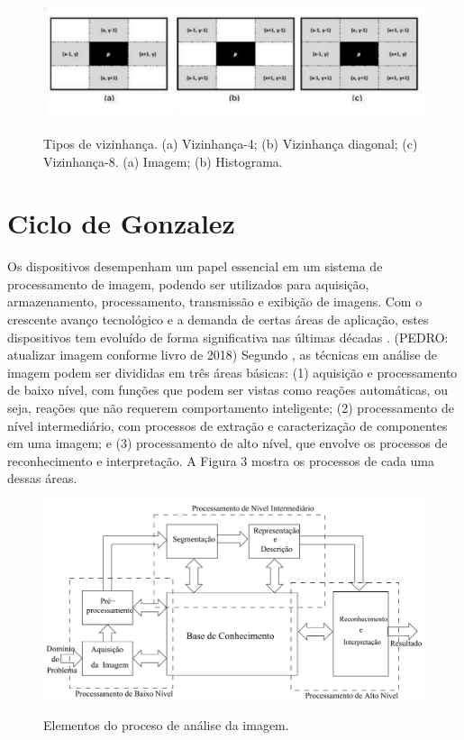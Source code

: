  \begin{figure}[h]
	\centering
	\includegraphics[width=1.0\textwidth]{Imagens/imagem3} %
	\caption[Texto que vai aparecer na lista de fig.]{Tipos de vizinhança. (a) Vizinhança-4; (b) Vizinhança diagonal; (c) Vizinhança-8.  (a) Imagem; (b) Histograma.}
	\label{fig:tux_laplace}
\end{figure}


\section{Ciclo de Gonzalez}
Os dispositivos desempenham um papel essencial em um sistema de processamento de imagem, podendo ser utilizados para aquisição, armazenamento, processamento, transmissão e exibição de imagens. Com o crescente avanço tecnológico e a demanda de certas áreas de aplicação, estes dispositivos tem evoluído de forma significativa nas últimas décadas \cite{PEDRINI2008}.
(PEDRO: atualizar imagem conforme livro de 2018)
Segundo , as técnicas em análise de imagem podem ser divididas em três áreas básicas: (1) aquisição e processamento de baixo nível, com funções que podem ser vistas como reações automáticas, ou seja, reações que não requerem comportamento inteligente; (2) processamento de nível intermediário, com processos de extração e caracterização de componentes em uma imagem; e (3) processamento de alto nível, que envolve os processos de reconhecimento e interpretação. A Figura 3 mostra os processos de cada uma dessas áreas.



 \begin{figure}[h]
	\centering
	\includegraphics[width=1.0\textwidth]{Imagens/imagem5} %
	\caption[Elementos do processo de análise de imagem.]{Elementos do proceso de análise da imagem. }
	\label{fig:tux_laplace}
\end{figure}




